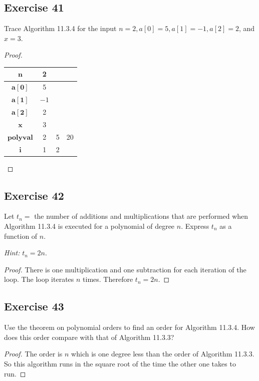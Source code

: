 \documentclass[14pt]{extarticle}
\begin{document}
\subsection{Exercise 41}
Trace Algorithm 11.3.4 for the input \(n = 2, a[0] = 5, a[1] = -1, a[2] = 2\), and \(x = 3\).

\begin{proof}
\begin{center}
\begin{tabular}{|c|c|c|c|}
\hline
\(\bm{n}\)       &2&  &   \\
\hline
\(\bm{a[0]}\)    &5&  &   \\
\hline
\(\bm{a[1]}\) &$-1$&  &   \\
\hline
\(\bm{a[2]}\)    &2&  &   \\
\hline
\(\bm{x}\)       &3&  &   \\
\hline
\(\bm{polyval}\) &2& 5&20 \\
\hline
\(\bm{i}\)       &1& 2&   \\
\hline
\end{tabular}
\end{center}
\end{proof}

\subsection{Exercise 42}
Let \(t_n =\) the number of additions and multiplications that are performed when Algorithm 11.3.4 is executed for a 
polynomial of degree \(n\). Express \(t_n\) as a function of \(n\).

{\it Hint:} \(t_n = 2n\).

\begin{proof}
There is one multiplication and one subtraction for each iteration of the loop. The loop iterates \(n\) times. 
Therefore \(t_n = 2n\).
\end{proof}

\subsection{Exercise 43}
Use the theorem on polynomial orders to find an order for Algorithm 11.3.4. How does this order compare with that of 
Algorithm 11.3.3?

\begin{proof}
The order is \(n\) which is one degree less than the order of Algorithm 11.3.3. So this algorithm runs in the square root of
the time the other one takes to run.
\end{proof}
\end{document}
